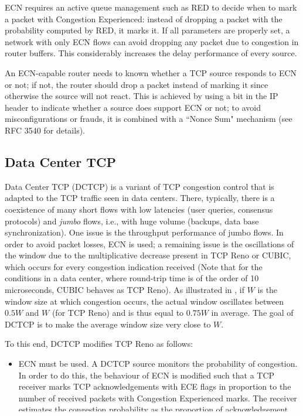 ECN requires an active queue management such as RED to decide when to mark a packet with Congestion Experienced: instead of dropping a packet with the probability computed by RED, it marks it. If all parameters are properly set, a network with only ECN flows can avoid dropping any packet due to congestion in router buffers. This considerably increases the delay performance of every source.

An ECN-capable router needs to known whether a TCP source responds to ECN or not; if not, the router should drop a packet instead of marking it since otherwise the source will not react. This is achieved by using a bit in the IP header to indicate whether a source does support ECN or not; to avoid misconfigurations or frauds, it is combined with a ``Nonce Sum" mechanism (see RFC 3540 for details).


\subsection{Data Center TCP}
Data Center TCP (DCTCP) is a variant of TCP congestion control that is adapted to the TCP traffic seen in data centers. There, typically, there is a coexistence of many short flows with low latencies (user queries, consensus protocols) and \emph{jumbo} flows, i.e.,  with huge volume (backups, data base synchronization). One issue is the throughput performance of jumbo flows. In order to avoid packet losses, ECN is used; a remaining issue is the oscillations of the window due to the multiplicative decrease present in TCP Reno or CUBIC, which occurs for every congestion indication received (Note that for the conditions in a data center, where round-trip time is of the order of 10 microseconds, CUBIC behaves as TCP Reno). As illustrated in , if $W$ is the window size at which congestion occurs, the actual window oscillates between $0.5W$ and $W$ (for TCP Reno) and is thus equal to $0.75W$ in average. The goal of DCTCP is to make the average window size very close to $W$.

To this end, DCTCP modifies TCP Reno as follows:

\begin{itemize}
  \item ECN must be used. A DCTCP source monitors the probability of congestion. In order to do this, the behaviour of ECN is modified such that a TCP receiver marks TCP acknowledgements with ECE flags in proportion to the number of received packets with Congestion Experienced marks. The receiver estimates the congestion probability as the proportion of acknowledgement packets with ECE flags. This differs from standard ECN behaviour, where feedback is a single bit of information per round trip time.

  \item When there is some non zero probability of congestion $q$, the multiplicative decrease factor is
  \ben
    \beta_{\footnotesize \mbox{DCTCP}}=\left( 1-\right)
  \een
\end{itemize}
It follows that if there is little congestion ($q$ is small) then the window reduction is small, much smaller than $0.5$. %

